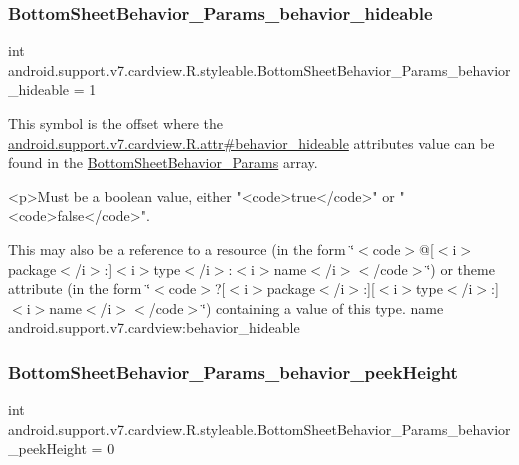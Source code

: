 \subsubsection{\texorpdfstring{Bottom\+Sheet\+Behavior\+\_\+\+Params\+\_\+behavior\+\_\+hideable}{BottomSheetBehavior\_Params\_behavior\_hideable}}
{\footnotesize\ttfamily int android.\+support.\+v7.\+cardview.\+R.\+styleable.\+Bottom\+Sheet\+Behavior\+\_\+\+Params\+\_\+behavior\+\_\+hideable = 1\hspace{0.3cm}{\ttfamily [static]}}

This symbol is the offset where the \hyperlink{classandroid_1_1support_1_1v7_1_1cardview_1_1R_1_1attr_a060d2bd5ef674ba58f9bdd768f7339db}{android.\+support.\+v7.\+cardview.\+R.\+attr\#behavior\+\_\+hideable} attribute\textquotesingle{}s value can be found in the \hyperlink{classandroid_1_1support_1_1v7_1_1cardview_1_1R_1_1styleable_a2c7e34ab9878226fa3cb5d06e0b274a8}{Bottom\+Sheet\+Behavior\+\_\+\+Params} array.

\begin{DoxyVerb}      <p>Must be a boolean value, either "<code>true</code>" or "<code>false</code>".
\end{DoxyVerb}
 

This may also be a reference to a resource (in the form \char`\"{}$<$code$>$@\mbox{[}$<$i$>$package$<$/i$>$\+:\mbox{]}$<$i$>$type$<$/i$>$\+:$<$i$>$name$<$/i$>$$<$/code$>$\char`\"{}) or theme attribute (in the form \char`\"{}$<$code$>$?\mbox{[}$<$i$>$package$<$/i$>$\+:\mbox{]}\mbox{[}$<$i$>$type$<$/i$>$\+:\mbox{]}$<$i$>$name$<$/i$>$$<$/code$>$\char`\"{}) containing a value of this type.  name android.\+support.\+v7.\+cardview\+:behavior\+\_\+hideable \mbox{\label{classandroid_1_1support_1_1v7_1_1cardview_1_1R_1_1styleable_a837e9a3aff36cd40661b35572539903d}} 
\subsubsection{\texorpdfstring{Bottom\+Sheet\+Behavior\+\_\+\+Params\+\_\+behavior\+\_\+peek\+Height}{BottomSheetBehavior\_Params\_behavior\_peekHeight}}
{\footnotesize\ttfamily int android.\+support.\+v7.\+cardview.\+R.\+styleable.\+Bottom\+Sheet\+Behavior\+\_\+\+Params\+\_\+behavior\+\_\+peek\+Height = 0\hspace{0.3cm}{\ttfamily [static]}}


